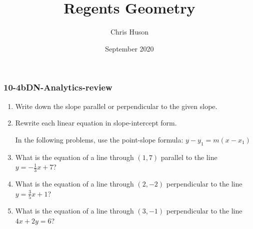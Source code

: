 \documentclass[12pt, twoside]{article}
\title{Regents Geometry}
\author{Chris Huson}
\date{September 2020}
\begin{document}
\subsubsection*{10-4bDN-Analytics-review}
\begin{enumerate}
\item Write down the slope parallel or perpendicular to the given slope. \vspace{0.5cm}
  \begin{enumerate}
  \end{enumerate}\vspace{0.15cm}

\item Rewrite each linear equation in slope-intercept form.
  \begin{enumerate}
  \end{enumerate}  \vspace{3cm}

  In the following problems, use the point-slope formula: $y-y_1=m (x-x_1)$
\item What is the equation of a line through $(1,7)$ parallel to the line $y=-\frac{1}{3}x+7$?  \vspace{3cm}
\item What is the equation of a line through $(2,-2)$ perpendicular to the line $y=\frac{3}{5}x+1$?  \vspace{3cm}
\item What is the equation of a line through $(3,-1)$ perpendicular to the line $4x+2y=6$?  \vspace{3cm}


\end{enumerate}
\end{document}
